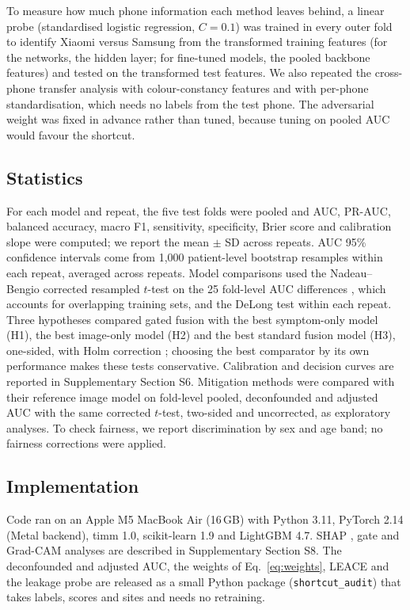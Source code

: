 \documentclass[preprint,12pt]{elsarticle}
\begin{document}
To measure how much phone information each method leaves behind, a linear probe (standardised logistic regression, $C = 0.1$) was trained in every outer fold to identify Xiaomi versus Samsung from the transformed training features (for the networks, the hidden layer; for fine-tuned models, the pooled backbone features) and tested on the transformed test features. We also repeated the cross-phone transfer analysis with colour-constancy features and with per-phone standardisation, which needs no labels from the test phone. The adversarial weight was fixed in advance rather than tuned, because tuning on pooled AUC would favour the shortcut.

\subsection{Statistics}

For each model and repeat, the five test folds were pooled and AUC, PR-AUC, balanced accuracy, macro F1, sensitivity, specificity, Brier score and calibration slope were computed; we report the mean $\pm$ SD across repeats. AUC 95\% confidence intervals come from 1,000 patient-level bootstrap resamples within each repeat, averaged across repeats. Model comparisons used the Nadeau--Bengio corrected resampled $t$-test on the 25 fold-level AUC differences \cite{nadeau2003inference}, which accounts for overlapping training sets, and the DeLong test \cite{delong1988,sun2014fastdelong} within each repeat. Three hypotheses compared gated fusion with the best symptom-only model (H1), the best image-only model (H2) and the best standard fusion model (H3), one-sided, with Holm correction \cite{holm1979}; choosing the best comparator by its own performance makes these tests conservative. Calibration and decision curves \cite{vickers2006dca} are reported in Supplementary Section S6. Mitigation methods were compared with their reference image model on fold-level pooled, deconfounded and adjusted AUC with the same corrected $t$-test, two-sided and uncorrected, as exploratory analyses. To check fairness, we report discrimination by sex and age band; no fairness corrections were applied.

\subsection{Implementation}

Code ran on an Apple M5 MacBook Air (16\,GB) with Python 3.11, PyTorch 2.14 (Metal backend), timm 1.0, scikit-learn 1.9 and LightGBM 4.7. SHAP \cite{lundberg2017shap}, gate and Grad-CAM \cite{selvaraju2017gradcam} analyses are described in Supplementary Section S8. The deconfounded and adjusted AUC, the weights of Eq.~\eqref{eq:weights}, LEACE and the leakage probe are released as a small Python package (\texttt{shortcut\_audit}) that takes labels, scores and sites and needs no retraining.
\end{document}

